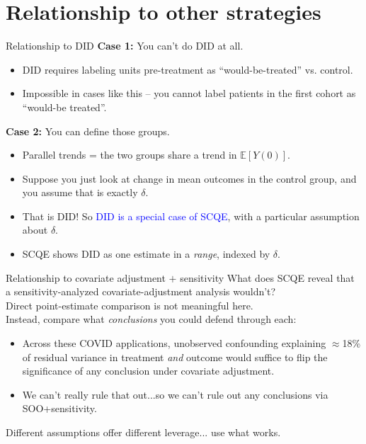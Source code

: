 \documentclass[handout,xcolor=dvipsnames,pdftex,hyperref={colorlinks=false}]{beamer}
\newcommand\E{\mathbb{E}}
\begin{document}
\section{Relationship to other strategies}

\begin{frame}{Relationship to DID}
\textbf{Case 1:} You can't do DID at all.\\
\small
\begin{itemize}
    \item DID requires labeling units pre-treatment as ``would-be-treated'' vs. control.
    \item Impossible in cases like this -- you cannot label patients in the first cohort as ``would-be treated''.
\end{itemize}
\medskip
\normalsize
{} \textbf{Case 2:} You can define those groups.\\
\small
\begin{itemize}
    \item Parallel trends = the two groups share a trend in $\E[Y(0)]$.
    \item  Suppose you just look at change in mean outcomes in the control group, and you assume that is exactly $\delta$.  
    \item That is DID! So \textcolor{blue}{DID is a special case of SCQE}, with a particular assumption about $\delta$.
    \item SCQE shows DID as one estimate in a \emph{range}, indexed by $\delta$.
\end{itemize}
\end{frame}

\begin{frame}{Relationship to covariate adjustment $+$ sensitivity}
\small
{} What does SCQE reveal that a sensitivity-analyzed covariate-adjustment analysis wouldn't?\\
\bigskip
{} Direct point-estimate comparison is not meaningful here.\\
\bigskip
{} Instead, compare what \emph{conclusions} you could defend through each:
\begin{itemize}
\item<4-> Across these COVID applications, unobserved confounding explaining $\approx$18\% of residual variance in treatment \emph{and} outcome would suffice to flip the significance of any conclusion under covariate adjustment.
\item<5-> We can't really rule that out...so we can't rule out any conclusions via SOO+sensitivity.
\end{itemize}
\bigskip
{} Different assumptions offer different leverage... use what works.
\end{frame}
\end{document}
